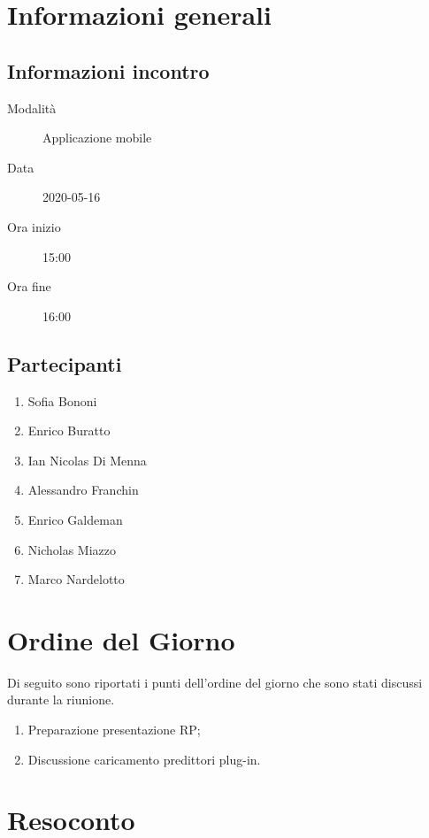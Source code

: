\documentclass{article}
\begin{document}


\section{Informazioni generali}%
\label{sec:informazioni_generali}

\subsection{Informazioni incontro}%
\label{sub:informazioni_incontro}

\begin{description}
  \item[Modalità] Applicazione mobile 
  \item[Data] 2020-05-16
  \item[Ora inizio] 15:00
  \item[Ora fine] 16:00
\end{description}

\subsection{Partecipanti}%
\label{sub:partecipanti}

\begin{enumerate}
  \item Sofia Bononi
  \item Enrico Buratto
  \item Ian Nicolas Di Menna
  \item Alessandro Franchin
  \item Enrico Galdeman
  \item Nicholas Miazzo
  \item Marco Nardelotto
\end{enumerate}

\section{Ordine del Giorno}%
\label{ordine_del_giorno}
Di seguito sono riportati i punti dell'ordine del giorno che sono stati discussi durante la riunione.
\begin{enumerate}
  \item Preparazione presentazione RP;
  \item Discussione caricamento predittori plug-in.
\end{enumerate}

\section{Resoconto}%
\label{resoconto}
\end{document}
